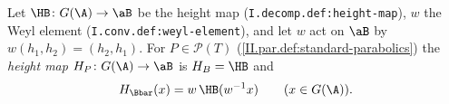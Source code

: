 Let $\HB\colon G(\A)\to\aB$ be the height map (\texttt{I.decomp.def:height-map}), $w$ the Weyl element
(\texttt{I.conv.def:weyl-element}), and let $w$ act on $\aB$ by $w(h_1,h_2)=(h_2,h_1)$. For $P\in\mathcal P(T)$
(\cref{II.par.def:standard-parabolics}) the \emph{height map} $H_P\colon G(\A)\to\aB$ is $H_B=\HB$ and
\[
  H_{\Bbar}(x)=w\,\HB(w^{-1}x)\qquad(x\in G(\A)).
\]
